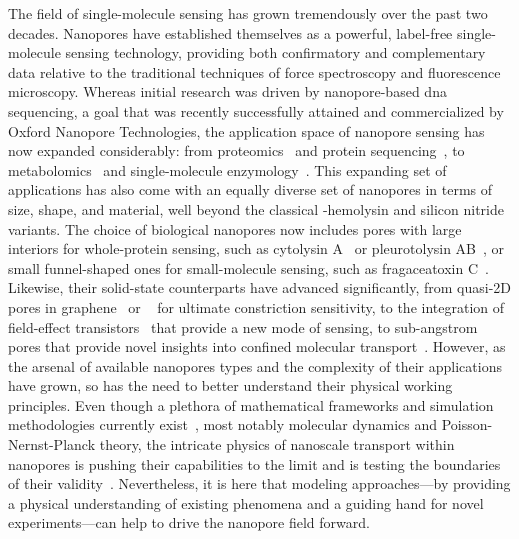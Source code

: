 The field of single-molecule sensing has grown tremendously over the past two decades. Nanopores have
established themselves as a powerful, label-free single-molecule sensing technology, providing both
confirmatory and complementary data relative to the traditional techniques of force spectroscopy and
fluorescence microscopy. Whereas initial research was driven by nanopore-based \gls{dna} sequencing, a goal
that was recently successfully attained and commercialized by Oxford Nanopore Technologies, the application
space of nanopore sensing has now expanded considerably: from proteomics~\cite{Yusko-2017,Houghtaling-2019}
and protein sequencing~\cite{Restrepo-Perez-2018}, to metabolomics~\cite{Zernia-2020} and single-molecule
enzymology~\cite{Galenkamp-2020,Willems-VanMeervelt-2017}. This expanding set of applications has also come
with an equally diverse set of nanopores in terms of size, shape, and material, well beyond the classical
\ta-hemolysin and silicon nitride variants. The choice of biological nanopores now includes pores with large
interiors for whole-protein sensing, such as cytolysin A~\cite{Soskine-2012} or pleurotolysin
AB~\cite{Huang-2020}, or small funnel-shaped ones for small-molecule sensing, such as fragaceatoxin
C~\cite{Huang-2017,Restrepo-Perez-2019a}. Likewise, their solid-state counterparts have advanced
significantly, from quasi-2D pores in graphene~\cite{Fischbein-2008} or ~\cite{Feng-2015b} for
ultimate constriction sensitivity, to the integration of field-effect transistors~\cite{Ren-2020} that provide
a new mode of sensing, to sub-angstrom pores that provide novel insights into confined molecular
transport~\cite{Rigo-2019}. However, as the arsenal of available nanopores types and the complexity of their
applications have grown, so has the need to better understand their physical working principles. Even though a
plethora of mathematical frameworks and simulation methodologies currently exist~\cite{Maffeo-2012}, most
notably molecular dynamics and Poisson-Nernst-Planck theory, the intricate physics of nanoscale transport
within nanopores is pushing their capabilities to the limit and is testing the boundaries of their
validity~\cite{Collins-2012}. Nevertheless, it is here that modeling approaches---by providing a physical
understanding of existing phenomena and a guiding hand for novel experiments---can help to drive the nanopore
field forward.


\cleardoublepage

